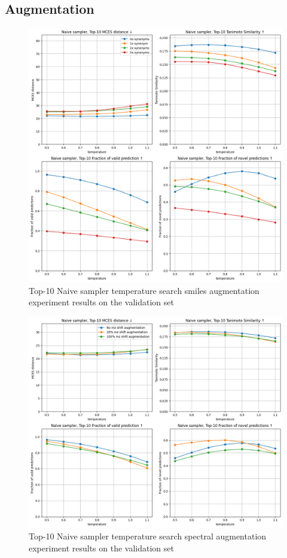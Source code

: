 \subsection*{Augmentation}
\begin{figure}[H]
    \centering
    \includegraphics[width=1.0\textwidth]{figures/appendix/smiles_augmentation_with_tanimoto.png}
    \caption{Top-10 Naive sampler temperature search smiles augmentation experiment results on the validation set}
    \label{fig:smiles_augmentation_appendix}
\end{figure}

\begin{figure}[H]
    \centering
    \includegraphics[width=1.0\textwidth]{figures/appendix/spectal_augmentation_with_tanimoto.png}
    \caption{Top-10 Naive sampler temperature search spectral augmentation experiment results on the validation set}
    \label{fig:spectral_augmentation_appendix}
\end{figure}

